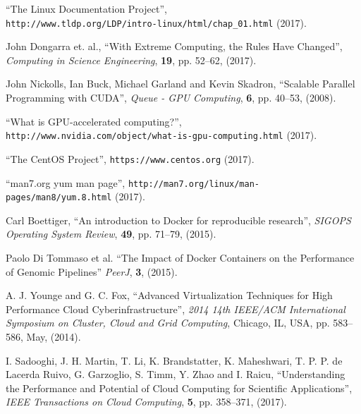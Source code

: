 \documentclass[twoside,a4paper,12pt,english]{inac19}
\begin{document}
\begin{thebibliography}{99} %

 ``The Linux Documentation Project'', \\\verb#http://www.tldp.org/LDP/intro-linux/html/chap_01.html# (2017).

 John Dongarra et. al., ``With Extreme Computing, the Rules Have Changed'', \textit{Computing in Science Engineering}, \textbf{19}, pp. 52--62, (2017).

 John Nickolls, Ian Buck, Michael Garland and Kevin Skadron, ``Scalable Parallel Programming with CUDA'', \textit{Queue - GPU Computing}, \textbf{6}, pp. 40--53, (2008).

 ``What is GPU-accelerated computing?'', \\\verb#http://www.nvidia.com/object/what-is-gpu-computing.html# (2017).

  
 ``The CentOS Project'', \verb#https://www.centos.org# (2017).

 ``man7.org yum man page'', \verb#http://man7.org/linux/man-pages/man8/yum.8.html# (2017).
  
 Carl Boettiger, ``An introduction to Docker for reproducible research'', \textit{SIGOPS Operating System Review}, \textbf{49}, pp. 71--79, (2015).

 Paolo Di Tommaso et al. ``The Impact of Docker Containers on the Performance of Genomic Pipelines'' \textit{PeerJ}, \textbf{3}, (2015).

 A. J. Younge and G. C. Fox, ``Advanced Virtualization Techniques for High Performance Cloud Cyberinfrastructure'', \textit{2014 14th IEEE/ACM International Symposium on Cluster, Cloud and Grid Computing}, Chicago, IL, USA, pp. 583--586, May, (2014).
  
 I. Sadooghi, J. H. Martin, T. Li, K. Brandstatter, K. Maheshwari, T. P. P. de Lacerda Ruivo, G. Garzoglio, S. Timm, Y. Zhao and I. Raicu, ``Understanding the Performance and Potential of Cloud Computing for Scientific Applications'', \textit{IEEE Transactions on Cloud Computing}, \textbf{5}, pp. 358--371, (2017).
  

\end{thebibliography}
\end{document}
